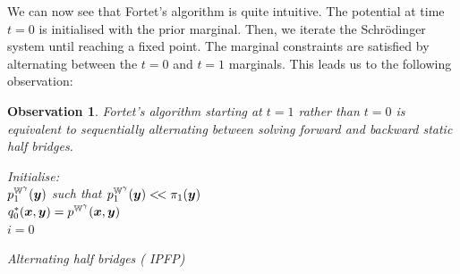 \documentclass[a4paper,12pt,twoside,openright]{report}
\newtheorem{observation}{Observation}
\theoremstyle{definition}
\begin{document}
We can now see that Fortet's algorithm is quite intuitive. The potential at time $t=0$ is initialised with the prior marginal. Then, we iterate the Schrödinger system until reaching a fixed point.  The marginal constraints are satisfied by alternating between the $t=0$ and $t=1$ marginals. This leads us to the following observation:
\begin{observation}\label{obs:forkek}
Fortet's algorithm starting at $t=1$ rather than $t=0$ is equivalent to sequentially alternating between solving  forward and backward static half bridges.
\begin{algorithm} \label{alg:ipfp_intro}
Initialise:\\
$p^{\mathbb{W}^{\gamma}}_1({\bm{y}})$ such that $p^{\mathbb{W}^{\gamma}}_1({\bm{y}}) <\!< \pi_1({\bm{y}})$ \\
$ q^{*}_{0}({\bm{x}},{\bm{y}}) =p^{\mathbb{W}^{\gamma}}({\bm{x}},{\bm{y}})$\\
$i=0$ \\
\caption{Alternating half bridges (\cite{kullback1968probability} IPFP) }
\end{algorithm}
\end{observation}
\end{document}
